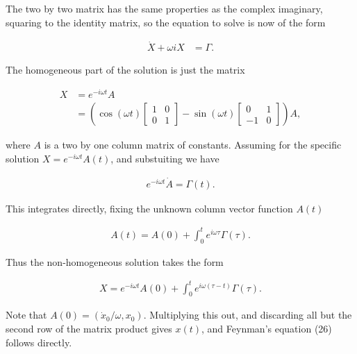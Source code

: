 The two by two matrix has the same properties as the complex imaginary, squaring to the identity matrix, so the equation to solve is now of the form

\begin{align}\label{eqn:1dharmonicOsc:5}
\dot{X} + \omega i X &= \Gamma.
\end{align}

The homogeneous part of the solution is just the matrix

\begin{align*}
X 
&= e^{-i \omega t} A \\
&= 
\left( 
\cos(\omega t) 
\begin{bmatrix}
1 & 0 \\
0 & 1
\end{bmatrix}
- 
\sin(\omega t)
\begin{bmatrix}
0 & 1 \\
-1 & 0
\end{bmatrix}
\right) A,
\end{align*}

where $A$ is a two by one column matrix of constants.  Assuming for the specific solution $X = e^{-i \omega t} A(t)$, and substuiting we have

\begin{align}\label{eqn:1dharmonicOsc:6}
e^{-i \omega t} \dot{A} = \Gamma(t).
\end{align}

This integrates directly, fixing the unknown column vector function $A(t)$

\begin{align}\label{eqn:1dharmonicOsc:7}
A(t) = A(0) + \int_0^t e^{i \omega \tau} \Gamma(\tau).
\end{align}

Thus the non-homogeneous solution takes the form

\begin{align}\label{eqn:1dharmonicOsc:8}
X = e^{-i \omega t} A(0) + \int_0^t e^{i \omega (\tau - t)} \Gamma(\tau).
\end{align}

Note that $A(0) = (\dot{x}_0/\omega, x_0)$.  Multiplying this out, and discarding all but the second row of the matrix product gives $x(t)$, and Feynman's equation (26) follows directly.

\EndArticle
